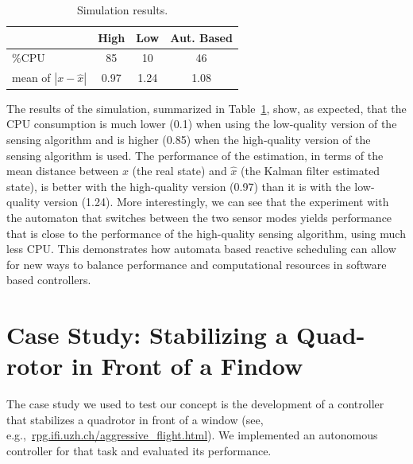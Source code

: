 \documentclass[ twoside, 12pt ]{article}
\begin{document}
\begin{table}
    \centering
    \begin{tabular}{ |  l  | c | c | c | }
        \hline
        &  High & Low & Aut. Based \\ \hline \hline
        \%CPU                    & 85 & 10  & 46 \\ \hline
        mean of $|x -\hat{x}|$ & 0.97 & 1.24 & 1.08 \\ \hline
    \end{tabular}
    \caption{Simulation results.}
    \label{tbl:sim-results}
\end{table}

The results of the simulation, summarized in Table~\ref{tbl:sim-results}, show, as expected, that the CPU consumption is much lower (0.1) when using the low-quality version of the sensing algorithm and is higher (0.85) when the high-quality version of the sensing algorithm is used. The performance of the estimation, in terms of the mean distance between $x$ (the real state) and $\hat x$ (the Kalman filter estimated state), is better with the high-quality version (0.97) than it is with the low-quality version (1.24). More interestingly, we can see that the experiment with the automaton that switches between the two sensor modes yields performance that is close to the performance of the high-quality sensing algorithm, using much less CPU. This demonstrates how automata based reactive scheduling can allow for new ways to balance performance and computational resources in software based controllers. 

\section{Case Study: Stabilizing a Quad-rotor in Front of a Findow}
\label{sec:caseStudy}

The case study we used to test our concept is the development of a controller that stabilizes a quadrotor in front of a window (see, e.g.,~\url{rpg.ifi.uzh.ch/aggressive_flight.html}).
We implemented an autonomous controller for that task and evaluated its performance.
\end{document}

